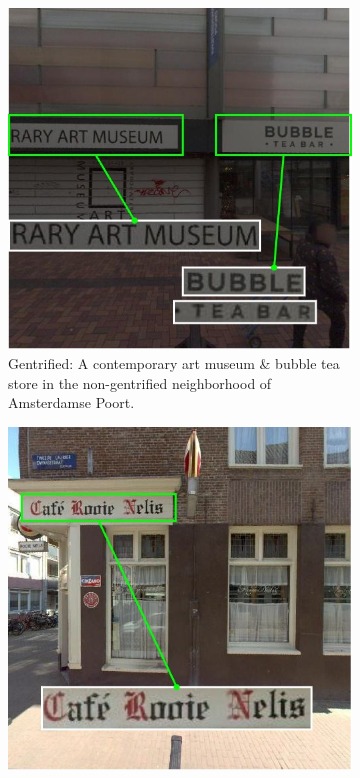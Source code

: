 \begin{figure}[h]
    \centering
    \begin{subfigure}[b]{0.22\textwidth}
        \includegraphics[width=\textwidth]{media/results/detect/detect_ex_gen.jpg}
        \caption{Gentrified: A contemporary art museum \& bubble tea store in the non-gentrified neighborhood of Amsterdamse Poort.}
    \end{subfigure}
    \quad
    \begin{subfigure}[b]{0.22\textwidth}
        \includegraphics[width=\textwidth]{media/results/detect/detect_ex_non.jpg}

\end{subfigure}
\end{figure}
